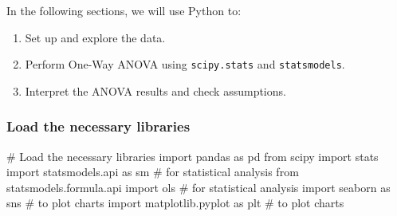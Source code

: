 \documentclass[
  letterpaper,
  DIV=11,
  numbers=noendperiod]{scrartcl}
\newenvironment{Shaded}{\begin{snugshade}}{\end{snugshade}}
\newcommand{\CommentTok}[1]{\textcolor[rgb]{0.37,0.37,0.37}{#1}}
\newcommand{\ImportTok}[1]{\textcolor[rgb]{0.00,0.46,0.62}{#1}}
\newcommand{\NormalTok}[1]{\textcolor[rgb]{0.00,0.23,0.31}{#1}}
\begin{document}
In the following sections, we will use Python to:

\begin{enumerate}
\def\labelenumi{\arabic{enumi}.}
\item
  Set up and explore the data.
\item
  Perform One-Way ANOVA using \texttt{scipy.stats} and
  \texttt{statsmodels}.
\item
  Interpret the ANOVA results and check assumptions.
\end{enumerate}

\hypertarget{load-the-necessary-libraries}{%
\subsubsection{Load the necessary
libraries}\label{load-the-necessary-libraries}}

\begin{Shaded}
\begin{Highlighting}[]
\CommentTok{\# Load the necessary libraries}
\ImportTok{import}\NormalTok{ pandas }\ImportTok{as}\NormalTok{ pd}
\ImportTok{from}\NormalTok{ scipy }\ImportTok{import}\NormalTok{ stats}
\ImportTok{import}\NormalTok{ statsmodels.api }\ImportTok{as}\NormalTok{ sm }\CommentTok{\# for statistical analysis}
\ImportTok{from}\NormalTok{ statsmodels.formula.api }\ImportTok{import}\NormalTok{ ols }\CommentTok{\# for statistical analysis}
\ImportTok{import}\NormalTok{ seaborn }\ImportTok{as}\NormalTok{ sns }\CommentTok{\# to plot charts }
\ImportTok{import}\NormalTok{ matplotlib.pyplot }\ImportTok{as}\NormalTok{ plt }\CommentTok{\# to plot charts}
\end{Highlighting}
\end{Shaded}
\end{document}

